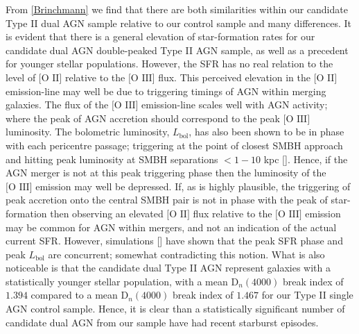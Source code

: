 From \ref{Brinchmann} we find that there are both similarities within our candidate Type II dual AGN sample relative to our control sample and many differences. It is evident that there is a general elevation of star-formation rates for our candidate dual AGN double-peaked Type II AGN sample, as well as a precedent for younger stellar populations. However, the SFR has no real relation to the level of $\text{[O II]}$ relative to the $\text{[O III]}$ flux. This perceived elevation in the $\text{[O II]}$ emission-line may well be due to triggering timings of AGN within merging galaxies. The flux of the $\text{[O III]}$ emission-line scales well with AGN activity; where the peak of AGN accretion should correspond to the peak $\text{[O III]}$ luminosity. The bolometric luminosity, $L_{\text{bol}}$, has also been shown to be in phase with each pericentre passage; triggering at the point of closest SMBH approach and hitting peak luminosity at SMBH separations $<{1-10}$ kpc [\cite{Van_Wassenhove_2012}]. Hence, if the AGN merger is not at this peak triggering phase then the luminosity of the $\text{[O III]}$ emission may well be depressed. If, as is highly plausible, the triggering of peak accretion onto the central SMBH pair is not in phase with the peak of star-formation then observing an elevated $\text{[O II]}$ flux relative to the $\text{[O III]}$ emission may be common for AGN within mergers, and not an indication of the actual current SFR. However, simulations [\cite{Van_Wassenhove_2012}] have shown that the peak SFR phase and peak $L_{\text{bol}}$ are concurrent; somewhat contradicting this notion. What is also noticeable is that the candidate dual Type II AGN represent galaxies with a statistically younger stellar population, with a mean $\text{D}_{n}(4000)$ break index of $1.394$ compared to a mean $\text{D}_{n}(4000)$ break index of $1.467$ for our Type II single AGN control sample. Hence, it is clear than a statistically significant number of candidate dual AGN from our sample have had recent starburst episodes.      

